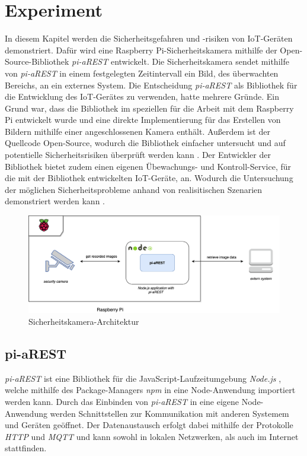 \section{Experiment}
In diesem Kapitel werden die Sicherheitsgefahren und -risiken von IoT-Geräten demonstriert. 
Dafür wird eine Raspberry Pi-Sicherheitskamera mithilfe der Open-Source-Bibliothek \textit{pi-aREST} \cite{piarestgtihub, piarestnpm}
entwickelt. Die Sicherheitskamera sendet mithilfe von \textit{pi-aREST} in einem festgelegten 
Zeitintervall ein Bild, des überwachten Bereichs, an ein externes System. Die Entscheidung \textit{pi-aREST} 
als Bibliothek für die Entwicklung des IoT-Gerätes zu verwenden, hatte mehrere Gründe. 
Ein Grund war, dass die Bibliothek im speziellen für die Arbeit mit dem Raspberry Pi entwickelt wurde
und eine direkte Implementierung für das Erstellen von Bildern mithilfe einer angeschlossenen Kamera
enthält. Außerdem ist der Quellcode Open-Source, wodurch die Bibliothek einfacher untersucht
und auf potentielle Sicherheitsrisiken überprüft werden kann \cite{piarestgtihub}. Der Entwickler der Bibliothek
bietet zudem einen eigenen Übewachungs- und Kontroll-Service, für die mit der Bibliothek
entwickelten IoT-Geräte, an. Wodurch die Untersuchung der möglichen Sicherheitsprobleme anhand von 
realisitischen Szenarien demonstriert werden kann \cite{arestservice}.  \\

\begin{figure}[h]
  \centering
  \includegraphics[width=125mm]{images/raspberry_architecture.png}
  \caption{Sicherheitskamera-Architektur \cite{piarestgtihub}}
  \label{fig:arch-raspberrypi}
\end{figure}


\subsection{pi-aREST}
\textit{pi-aREST} ist eine Bibliothek für die JavaScript-Laufzeitumgebung \textit{Node.js} \cite{node}, welche mithilfe
des Package-Managers \textit{npm} \cite{piarestnpm} in eine Node-Anwendung importiert werden kann. Durch das Einbinden
von \textit{pi-aREST} in eine eigene Node-Anwendung werden Schnittstellen zur Kommunikation mit anderen
Systemem und Geräten geöffnet. Der Datenaustausch erfolgt dabei mithilfe der Protokolle \textit{HTTP} 
und \textit{MQTT} und kann sowohl in lokalen Netzwerken, als auch im Internet stattfinden. \cite{piarestgtihub}

